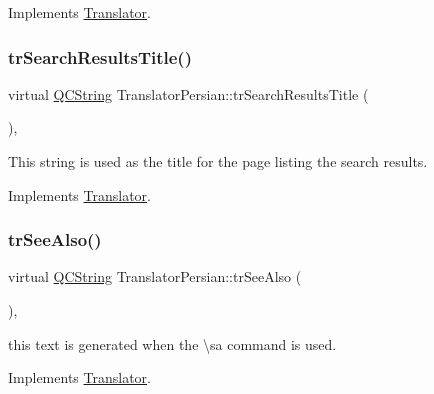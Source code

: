 Implements \mbox{\hyperlink{class_translator}{Translator}}.

\mbox{\label{class_translator_persian_a3193c6847115a6384ac397f6df616897}} 
\subsubsection{\texorpdfstring{trSearchResultsTitle()}{trSearchResultsTitle()}}
{\footnotesize\ttfamily virtual \mbox{\hyperlink{class_q_c_string}{Q\+C\+String}} Translator\+Persian\+::tr\+Search\+Results\+Title (\begin{DoxyParamCaption}{ }\end{DoxyParamCaption})\hspace{0.3cm}{\ttfamily [inline]}, {\ttfamily [virtual]}}

This string is used as the title for the page listing the search results. 

Implements \mbox{\hyperlink{class_translator}{Translator}}.

\mbox{\label{class_translator_persian_a3ab1ae84a89ff2b4f47cc4455c03af28}} 
\subsubsection{\texorpdfstring{trSeeAlso()}{trSeeAlso()}}
{\footnotesize\ttfamily virtual \mbox{\hyperlink{class_q_c_string}{Q\+C\+String}} Translator\+Persian\+::tr\+See\+Also (\begin{DoxyParamCaption}{ }\end{DoxyParamCaption})\hspace{0.3cm}{\ttfamily [inline]}, {\ttfamily [virtual]}}

this text is generated when the \textbackslash{}sa command is used. 

Implements \mbox{\hyperlink{class_translator}{Translator}}.

\mbox{\label{class_translator_persian_a7dca0aca24a6c2c76760fb85e95a1b9a}} 
